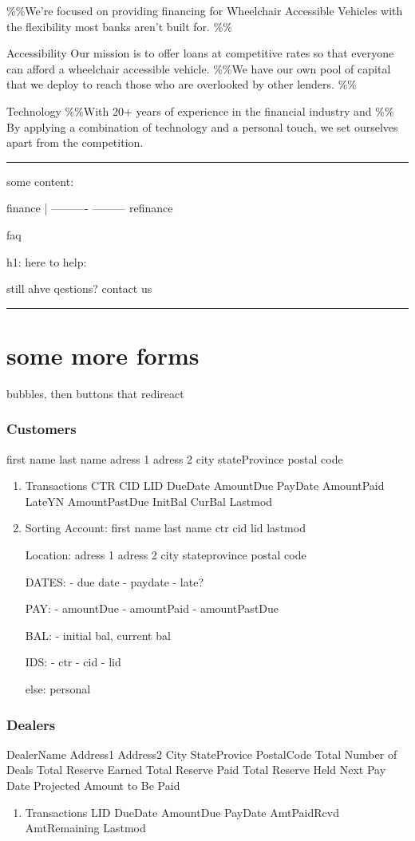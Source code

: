 \documentclass[letterpaper]{article}
\begin{document}
\%\%We're focused on providing financing for Wheelchair Accessible
Vehicles with the flexibility most banks aren't built for. \%\%

Accessibility Our mission is to offer loans at competitive rates so that
everyone can afford a wheelchair accessible vehicle. \%\%We have our own
pool of capital that we deploy to reach those who are overlooked by
other lenders. \%\%

Technology \%\%With 20+ years of experience in the financial industry and
\%\% By applying a combination of technology and a personal touch, we set
ourselves apart from the competition.

\noindent\rule{\textwidth}{0.5pt}

some content:

finance | ---------- --------- refinance

faq

h1: here to help:

still ahve qestions? contact us

\noindent\rule{\textwidth}{0.5pt}

\section{some more forms}
\label{sec:orga6f699f}
bubbles, then buttons that redireact

\subsubsection{Customers}
\label{sec:org51ea603}
first name last name adress 1 adress 2 city stateProvince postal code

\begin{enumerate}
\item Transactions
\label{sec:orga59a687}
CTR CID LID DueDate AmountDue PayDate AmountPaid LateYN AmountPastDue
InitBal CurBal Lastmod

\item Sorting
\label{sec:org5492bf7}
Account: first name last name ctr cid lid lastmod

Location: adress 1 adress 2 city stateprovince postal code

DATES: - due date - paydate - late?

PAY: - amountDue - amountPaid - amountPastDue

BAL: - initial bal, current bal

IDS: - ctr - cid - lid

else: personal
\end{enumerate}

\subsubsection{Dealers}
\label{sec:org85da81a}
DealerName Address1 Address2 City StateProvice PostalCode Total Number
of Deals Total Reserve Earned Total Reserve Paid Total Reserve Held Next
Pay Date Projected Amount to Be Paid

\begin{enumerate}
\item Transactions
\label{sec:org29ad9d2}
LID DueDate AmountDue PayDate AmtPaidRcvd AmtRemaining Lastmod
\end{enumerate}
\end{document}
